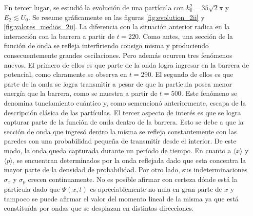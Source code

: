 \documentclass[aps,prb,twocolumn,superscriptaddress,floatfix,longbibliography]{revtex4-2}
\begin{document}
En tercer lugar, se estudió la evolución de una partícula con $k_0^2 = 35 \sqrt{2} \pi$ y $E_2 \lesssim U_0$. Se resume gráficamente en las figuras \ref{fig:evolution_2ii} y \ref{fig:valores_medios_2ii}. La diferencia con la situación anterior radica en la interacción con la barrera a partir de $t = 220$. Como antes, una sección de la función de onda se refleja interfiriendo consigo misma y produciendo consecuentemente grandes oscilaciones. Pero además ocurren tres fenómenos nuevos. El primero de ellos es que parte de la onda logra ingresar en la barrera de potencial, como claramente se observa en $t = 290$. El segundo de ellos es que parte de la onda se logra transmitir a pesar de que la partícula posea menor energía que la barrera, como se muestra a partir de $t = 500$. Este fenómeno se denomina tunelamiento cuántico y, como semencionó anteriormente, escapa de la descripción clásica de las partículas. El tercer aspecto de interés es que se logra capturar parte de la función de onda dentro de la barrera. Esto se debe a que la sección de onda que ingresó dentro la misma se refleja constantemente con las paredes con una probabilidad pequeña de transmitir desde el interior. De este modo, la onda queda capturada durante un período de tiempo. En cuanto a $\langle x \rangle$ y $\langle p \rangle$, se encuentran determinados por la onda reflejada dado que esta concentra la mayor parte de la densidad de probabilidad. Por otro lado, sus indeterminaciones $\sigma_x$ y $\sigma_p$ crecen continuamente. No es posible afirmar con certeza dónde está la partícula dado que $\Psi(x,t)$ es apreciablemente no nula en gran parte de $x$ y tampoco se puede afirmar el valor del momento lineal de la misma ya que está constituída por ondas que se desplazan en distintas direcciones.
\end{document}
